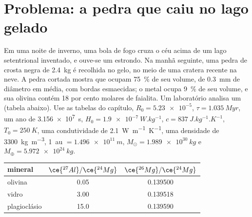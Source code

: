 \section{Problema: a pedra que caiu no lago gelado}

\begin{problem}
\label{pb:b2:planet-formation-meteorites:1}
Em uma noite de inverno, uma bola de fogo cruza o céu acima de um lago setentrional inventado,
e ouve-se um estrondo. Na manhã seguinte, uma pedra de crosta negra de \qty{2.4}{kg} é
recolhida no gelo, no meio de uma cratera recente na neve. A pedra
cortada mostra  que ocupam \qty{75}{\percent} de seu volume, de \qty{0.3}{mm}
de diâmetro em média, com bordas esmaecidas; o metal ocupa \qty{9}{\percent} de seu
volume, e sua olivina contém 18 por cento molares de faialita. Um laboratório
analisa um  (tabela abaixo). Use as tabelas do capítulo,
$R_0 = \num{5.23e-5}$, $\tau = \qty{1.035}{Myr}$, um ano de \qty{3.156e7}{s},
$H_0 = \qty{1.9e-7}{W.kg^{-1}}$, $c = \qty{837}{J.kg^{-1}.K^{-1}}$,
$T_0 = \qty{250}{K}$, uma condutividade de \qty{2.1}{W.m^{-1}.K^{-1}}, uma densidade de
\qty{3300}{kg.m^{-3}}, \qty{1}{au} $= \qty{1.496e11}{m}$,
$M_\odot = \qty{1.989e30}{kg}$ e $M_\oplus = \qty{5.972e24}{kg}$.

\begin{center}
\small
\begin{tabular}{lcc}
\hline
mineral & $\ce{^{27}Al}/\ce{^{24}Mg}$ & $\ce{^{26}Mg}/\ce{^{24}Mg}$\\
\hline
olivina & 0.05 & \num{0.139500}\\
vidro & 3.00 & \num{0.139518}\\
plagioclásio & 15.0 & \num{0.139590}\\
\hline
\end{tabular}
\end{center}


\end{problem}

